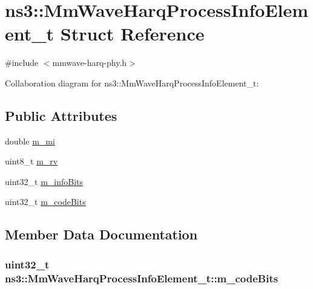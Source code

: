 \hypertarget{structns3_1_1MmWaveHarqProcessInfoElement__t}{}\section{ns3\+:\+:Mm\+Wave\+Harq\+Process\+Info\+Element\+\_\+t Struct Reference}
\label{structns3_1_1MmWaveHarqProcessInfoElement__t}


{\ttfamily \#include $<$mmwave-\/harq-\/phy.\+h$>$}



Collaboration diagram for ns3\+:\+:Mm\+Wave\+Harq\+Process\+Info\+Element\+\_\+t\+:
\subsection*{Public Attributes}
\begin{DoxyCompactItemize}
\item 
double \hyperlink{structns3_1_1MmWaveHarqProcessInfoElement__t_affe61e696f0dc96bbdfa2e2255005837}{m\+\_\+mi}
\item 
uint8\+\_\+t \hyperlink{structns3_1_1MmWaveHarqProcessInfoElement__t_a86ca6997db34b618a7b3956d17cc8b76}{m\+\_\+rv}
\item 
uint32\+\_\+t \hyperlink{structns3_1_1MmWaveHarqProcessInfoElement__t_a25cbfe7378cef219db62697112384d84}{m\+\_\+info\+Bits}
\item 
uint32\+\_\+t \hyperlink{structns3_1_1MmWaveHarqProcessInfoElement__t_af7905a2ca931ae3a8de0001cfa58c4e5}{m\+\_\+code\+Bits}
\end{DoxyCompactItemize}


\subsection{Member Data Documentation}
\subsubsection[{\texorpdfstring{m\+\_\+code\+Bits}{m_codeBits}}]{\setlength{\rightskip}{0pt plus 5cm}uint32\+\_\+t ns3\+::\+Mm\+Wave\+Harq\+Process\+Info\+Element\+\_\+t\+::m\+\_\+code\+Bits}\hypertarget{structns3_1_1MmWaveHarqProcessInfoElement__t_af7905a2ca931ae3a8de0001cfa58c4e5}{}\label{structns3_1_1MmWaveHarqProcessInfoElement__t_af7905a2ca931ae3a8de0001cfa58c4e5}
